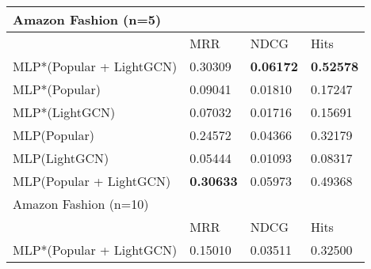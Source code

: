 \begin{tabular}{llll}
\hline
 Amazon Fashion (n=5)     &                                                         &                                                         &                                                         \\\hline
                          & MRR                                                     & NDCG                                                    & Hits                                                    \\\hline
 MLP*(Popular + LightGCN) & 0.30309                                                 & \textbf{0.06172}                                                 & \textbf{0.52578}                                                 \\
 MLP*(Popular)            & 0.09041                                                 & 0.01810                                                 & 0.17247                                                 \\
 MLP*(LightGCN)           & 0.07032                                                 & 0.01716                                                 & 0.15691                                                 \\
 MLP(Popular)             & 0.24572                                                 & 0.04366                                                 & 0.32179                                                 \\
 MLP(LightGCN)            & 0.05444                                                 & 0.01093                                                 & 0.08317                                                 \\
 MLP(Popular + LightGCN)  & \textbf{0.30633}          & 0.05973 & 0.49368 \\\hline
 Amazon Fashion (n=10)    &                                                         &                                                         &                                                         \\\hline
                          & MRR                                                     & NDCG                                                    & Hits                                                    \\\hline
 MLP*(Popular + LightGCN) & 0.15010                                                 & 0.03511                                                 & 0.32500                                                 \\

\end{tabular}
